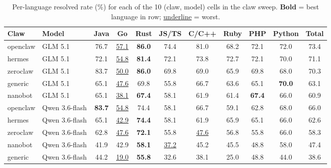 \documentclass{llmxive}
\begin{document}
\begin{table}[!htbp]
\centering
\small
\begin{tabular}{llcccccccc|c}
\toprule
Claw & Model & Java & Go & Rust & JS/TS & C/C++ & Ruby & PHP & Python & Total \\
\midrule
openclaw & GLM 5.1        & 76.7          & \underline{57.1} & \textbf{86.0} & 74.4 & 81.0 & 68.2 & 72.1 & 72.0 & 73.4 \\
hermes   & GLM 5.1        & 72.1          & \underline{54.8} & \textbf{81.4} & 72.1 & 73.8 & 72.7 & 72.1 & 70.0 & 71.1 \\
zeroclaw & GLM 5.1        & 83.7          & \underline{50.0} & \textbf{86.0} & 69.8 & 69.0 & 65.9 & 69.8 & 68.0 & 70.3 \\
generic  & GLM 5.1        & 65.1          & \underline{47.6} & 69.8          & 55.8 & 66.7 & 63.6 & 65.1 & \textbf{70.0} & 63.1 \\
nanobot  & GLM 5.1        & 65.1          & \underline{38.1} & \textbf{67.4} & 58.1 & 61.9 & 61.4 & \textbf{67.4} & 66.0 & 60.9 \\
\midrule
openclaw & Qwen 3.6-flash & \textbf{83.7} & \underline{54.8} & 74.4          & 58.1 & 66.7 & 59.1 & 62.8 & 68.0 & 66.0 \\
hermes   & Qwen 3.6-flash & 65.1          & \underline{42.9} & \textbf{74.4} & 58.1 & 61.9 & 65.9 & 65.1 & 66.0 & 62.6 \\
zeroclaw & Qwen 3.6-flash & 62.8          & \underline{47.6} & \textbf{72.1} & 55.8 & \underline{47.6} & 56.8 & 55.8 & 66.0 & 58.3 \\
nanobot  & Qwen 3.6-flash & 41.9          & 42.9             & \textbf{58.1} & \underline{37.2} & 45.2 & 45.5 & 48.8 & 58.0 & 47.4 \\
generic  & Qwen 3.6-flash & 44.2          & \underline{19.0} & \textbf{55.8} & 32.6 & 38.1 & 25.0 & 48.8 & 44.0 & 38.6 \\
\bottomrule
\end{tabular}
\caption{Per-language resolved rate (\%) for each of the 10 (claw, model) cells
in the claw sweep. \textbf{Bold} = best language in row;
\underline{underline} = worst.}
\label{tab:appG-per-lang-B}
\end{table}
\end{document}
